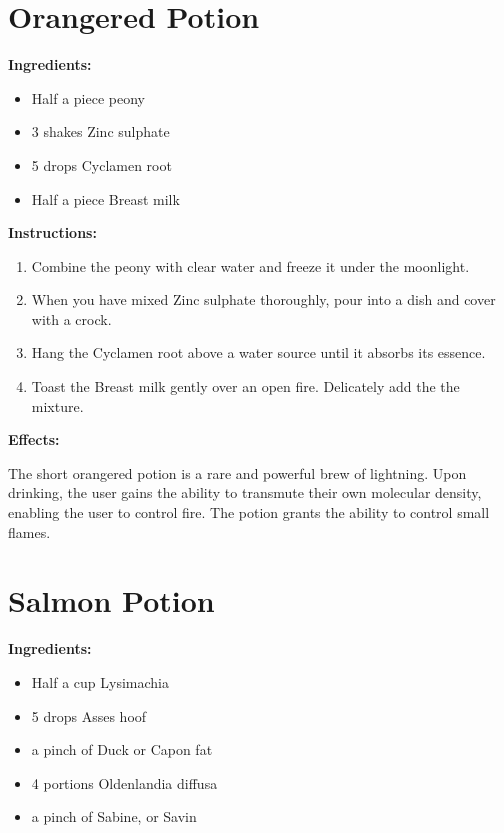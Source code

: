 \documentclass{article}
\begin{document}
\newpage
\section*{Orangered Potion}

\textbf{Ingredients:}

\begin{itemize}
  \item Half a piece peony
  \item 3 shakes Zinc sulphate
  \item 5 drops Cyclamen root
  \item Half a piece Breast milk
\end{itemize}

\textbf{Instructions:}

\begin{enumerate}
  \item Combine the peony with clear water and freeze it under the moonlight.
  \item When you have mixed Zinc sulphate thoroughly, pour into a dish and cover with a crock.
  \item Hang the Cyclamen root above a water source until it absorbs its essence.
  \item Toast the Breast milk gently over an open fire. Delicately add the the mixture.
\end{enumerate}

\textbf{Effects:}

The short orangered potion is a rare and powerful brew of lightning. Upon drinking, the user gains the ability to transmute their own molecular density, enabling the user to control fire. The potion grants the ability to control small flames.

\newpage
\section*{Salmon Potion}

\textbf{Ingredients:}

\begin{itemize}
  \item Half a cup Lysimachia
  \item 5 drops Asses hoof
  \item a pinch of Duck or Capon fat
  \item 4 portions Oldenlandia diffusa
  \item a pinch of Sabine, or Savin
\end{itemize}
\end{document}
